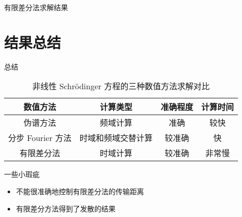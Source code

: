 \documentclass[aspectratio=169]{beamer}
\begin{document}
\begin{frame}{有限差分法求解结果}
  \begin{figure}[tbp]
    \centering
    \addtocounter{figure}{0}
  \end{figure}
\end{frame}

\section{结果总结}

\begin{frame}{总结}
  \begin{table}[htbp]
    \centering
    \caption{非线性 Schr\"odinger 方程的三种数值方法求解对比}
    \begin{tabular}{cccc}
      \toprule 
        数值方法 & 计算类型 & 准确程度 & 计算时间 \\
      \midrule  
        伪谱方法 & 频域计算 & 准确 & 较快 \\
        分步 Fourier 方法 & 时域和频域交替计算 & 较准确 & 快 \\
        有限差分法 & 时域计算 & 较准确 & 非常慢 \\
      \bottomrule
    \end{tabular}
  \end{table}
  \begin{alertblock}{一些小瑕疵}
    \begin{itemize}
      \item 不能很准确地控制有限差分法的传输距离
      \item 有限差分方法得到了发散的结果
    \end{itemize}
  \end{alertblock}
\end{frame}
\end{document}
